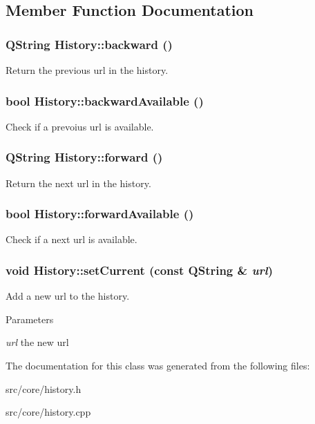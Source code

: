 \subsection{Member Function Documentation}
\hypertarget{classHistory_a41c8d23cb2789b07bc6229b203bafce3}{
\subsubsection[{backward}]{\setlength{\rightskip}{0pt plus 5cm}QString History::backward ()}}
\label{classHistory_a41c8d23cb2789b07bc6229b203bafce3}
Return the previous url in the history. \hypertarget{classHistory_ac8c3f249e76605c9686eacb4716c79b4}{
\subsubsection[{backwardAvailable}]{\setlength{\rightskip}{0pt plus 5cm}bool History::backwardAvailable ()}}
\label{classHistory_ac8c3f249e76605c9686eacb4716c79b4}
Check if a prevoius url is available. \hypertarget{classHistory_a83d69c4bfe79d19a6187f586e7311b22}{
\subsubsection[{forward}]{\setlength{\rightskip}{0pt plus 5cm}QString History::forward ()}}
\label{classHistory_a83d69c4bfe79d19a6187f586e7311b22}
Return the next url in the history. \hypertarget{classHistory_a1227493ba04f3f640c6648b9562bf68e}{
\subsubsection[{forwardAvailable}]{\setlength{\rightskip}{0pt plus 5cm}bool History::forwardAvailable ()}}
\label{classHistory_a1227493ba04f3f640c6648b9562bf68e}
Check if a next url is available. \hypertarget{classHistory_a7fd72e5b7289c61f32ec5d533d0356bf}{
\subsubsection[{setCurrent}]{\setlength{\rightskip}{0pt plus 5cm}void History::setCurrent (const QString \& {\em url})}}
\label{classHistory_a7fd72e5b7289c61f32ec5d533d0356bf}
Add a new url to the history. 
\begin{DoxyParams}{Parameters}
\item[{\em url}]the new url \end{DoxyParams}


The documentation for this class was generated from the following files:\begin{DoxyCompactItemize}
\item 
src/core/history.h\item 
src/core/history.cpp\end{DoxyCompactItemize}
